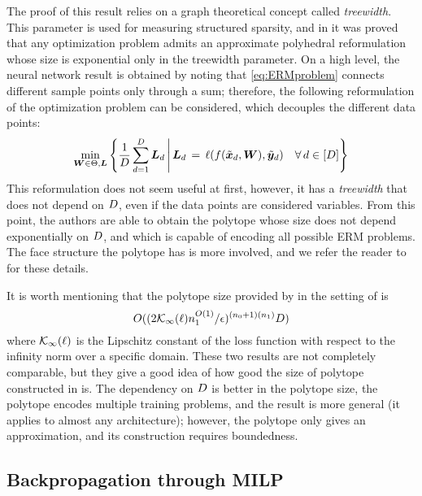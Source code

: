 The proof of this result relies on a graph theoretical concept called \emph{treewidth}. This parameter is used for measuring structured sparsity, and in \cite{bienstock2018lp} it was proved that any optimization problem admits an approximate polyhedral reformulation whose size is exponential only in the treewidth parameter. On a high level, the neural network result is obtained by noting that \eqref{eq:ERMproblem} connects different sample points only through a sum; therefore, the following reformulation of the optimization problem can be considered, which decouples the different data points:
%
\begin{align}
\label{ERMepigraph}
    \min_{{\bm{W}} \in \Theta,{\bm{L}}} \left\{\frac{1}{D} \sum_{d = 1}^{D} {\bm{L}}_d   \, \middle| \, {\bm{L}}_d \, = \, \ell(f(\tilde{{\bm{x}}}_d, {\bm{W}}), \tilde{{\bm{y}}}_d) \quad \forall\, d\in [D] \right\}
  \end{align}
This reformulation does not seem useful at first, however, it has a \emph{treewidth} that does not depend on $D$, even if the data points are considered variables. From this point, the authors are able to obtain the polytope whose size does not depend exponentially on $D$, and which is capable of encoding all possible ERM problems. The face structure the polytope has is more involved, and we refer the reader to \cite{TrainingLP} for these details.

It is worth mentioning that the polytope size provided by \cite{TrainingLP} in the setting of \cite{arora2018understanding} is 
\begin{equation}\label{eq:oursize}
    O( ( 2\mathcal{K}_\infty(\ell) n_1^{O(1)} / \epsilon )^{({n_0}+1)(n_1)} D )
\end{equation}
where $\mathcal{K_\infty}(\ell)$ is the Lipschitz constant of the loss function with respect to the infinity norm over a specific domain. These two results are not completely comparable, but they give a good idea of how good the size of polytope constructed in \cite{TrainingLP} is. The dependency on $D$ is better in the polytope size, the polytope encodes multiple training problems, and the result is more general (it applies to almost any architecture); however, the polytope only gives an approximation, and its construction requires boundedness.

\subsection{Backpropagation through MILP}

